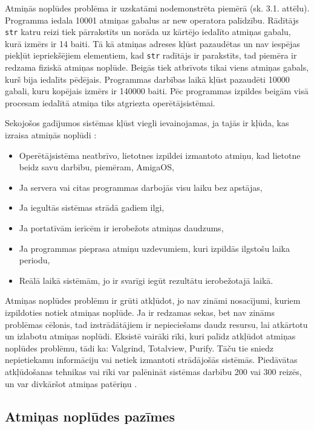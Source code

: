 Atmiņās noplūdes problēma ir uzskatāmi nodemonstrēta piemērā (sk. 3.1. attēlu).
Programma  iedala 10001 atmiņas gabalus ar new operatora palīdzību. 
Rādītājs \texttt{str} katru reizi tiek pārrakstīts un norāda uz kārtējo iedalīto atmiņas gabalu, kurā izmērs ir 14 baiti.
Tā kā atmiņas adreses kļūst pazaudētas un nav iespējas piekļūt iepriekšējiem elementiem, kad  \texttt{str} radītājs ir parakstīts, tad piemēra ir redzama fiziskā atmiņas noplūde.
Beigās tiek atbrīvots tikai viens atmiņas gabals, kurš bija iedalīts pēdējais. 
Programmas darbības laikā kļūst pazaudēti 10000 gabali, kuru kopējais izmērs ir 140000 baiti.
 Pēc programmas izpildes beigām visā procesam iedalītā atmiņa tiks atgriezta operētājsistēmai.


Sekojošos gadījumos sistēmas kļūst viegli ievainojamas, ja tajās ir kļūda, kas izraisa atmiņās noplūdi \cite{RTTV}: 
\begin{itemize}
\item { Operētājsistēma neatbrīvo, lietotnes izpildei izmantoto atmiņu, kad lietotne beidz savu darbību, piemēram, AmigaOS,}
\item { Ja servera vai citas programmas darbojās visu laiku bez apstājas, }
\item { Ja iegultās sistēmas strādā gadiem ilgi, }
\item { Ja portatīvām ierīcēm ir ierobežots atmiņas daudzums, }
\item { Ja programmas pieprasa atmiņu uzdevumiem, kuri izpildās ilgstošu laika periodu, }
\item { Reālā laikā sistēmām, jo ir svarīgi iegūt rezultātu ierobežotajā laikā. }
\end{itemize}

Atmiņas noplūdes problēmu ir grūti atkļūdot,  jo nav zināmi nosacījumi, kuriem izpildoties notiek atmiņas noplūde. 
Ja ir redzamas sekas, bet nav zināms problēmas cēlonis, tad izstrādātājiem ir nepieciešams daudz resursu, lai atkārtotu un izlabotu atmiņas noplūdi. 
Eksistē vairāki rīki, kuri palīdz atkļūdot atmiņas noplūdes problēmu, tādi ka: Valgrind, Totalview, Purify. 
Tāču tie sniedz nepietiekamu informāciju vai netiek izmantoti strādājošās sistēmās.
Piedāvātas atkļūdošanas tehnikas vai rīki var palēnināt sistēmas darbību 200 vai 300 reizēs, un var divkāršot atmiņas patēriņu \cite{atparv}. 



\subsection{Atmiņas noplūdes pazīmes}

